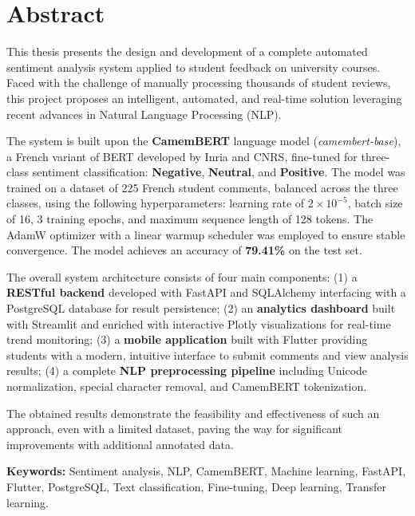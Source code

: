 \chapter*{Abstract}

\begin{tcolorbox}[
  enhanced,
  colback=vertprincipal!5!white,
  colframe=vertprincipal,
  boxrule=1.5pt, arc=6pt,
  left=10pt, right=10pt, top=8pt, bottom=8pt
]

This thesis presents the design and development of a complete automated
sentiment analysis system applied to student feedback on university courses.
Faced with the challenge of manually processing thousands of student reviews,
this project proposes an intelligent, automated, and real-time solution
leveraging recent advances in Natural Language Processing (NLP).

\vspace{0.5em}

The system is built upon the \textbf{CamemBERT} language model
(\textit{camembert-base}), a French variant of BERT developed by Inria and
CNRS, fine-tuned for three-class sentiment classification: \textbf{Negative},
\textbf{Neutral}, and \textbf{Positive}. The model was trained on a dataset
of 225 French student comments, balanced across the three classes, using the
following hyperparameters: learning rate of $2 \times 10^{-5}$, batch size
of 16, 3 training epochs, and maximum sequence length of 128 tokens. The
AdamW optimizer with a linear warmup scheduler was employed to ensure
stable convergence. The model achieves an accuracy of \textbf{79.41\%} on
the test set.

\vspace{0.5em}

The overall system architecture consists of four main components:
(1) a \textbf{RESTful backend} developed with FastAPI and SQLAlchemy
interfacing with a PostgreSQL database for result persistence;
(2) an \textbf{analytics dashboard} built with Streamlit and enriched
with interactive Plotly visualizations for real-time trend monitoring;
(3) a \textbf{mobile application} built with Flutter providing students
with a modern, intuitive interface to submit comments and view analysis
results; (4) a complete \textbf{NLP preprocessing pipeline} including
Unicode normalization, special character removal, and CamemBERT
tokenization.

\vspace{0.5em}

The obtained results demonstrate the feasibility and effectiveness of such
an approach, even with a limited dataset, paving the way for significant
improvements with additional annotated data.

\end{tcolorbox}

\vspace{0.8em}
\noindent\textbf{Keywords:} Sentiment analysis, NLP, CamemBERT, Machine
learning, FastAPI, Flutter, PostgreSQL, Text classification, Fine-tuning,
Deep learning, Transfer learning.

\cleardoublepage
